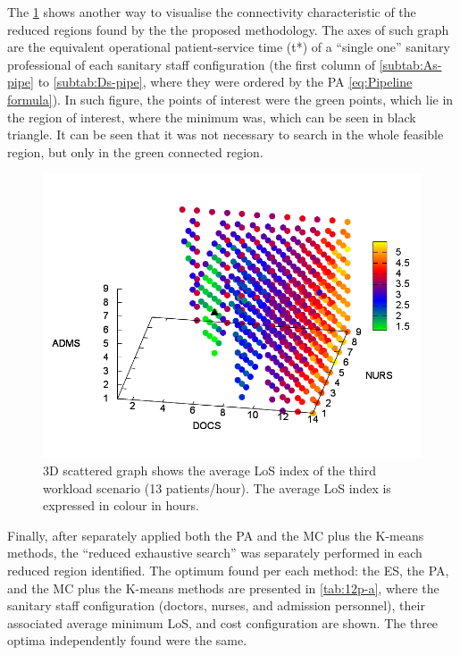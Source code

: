 The \ref{fig:3D-scattered-graph-75} shows another way to visualise
the connectivity characteristic of the reduced regions found by the
the proposed methodology. The axes of such graph are the equivalent
operational patient-service time \foreignlanguage{american}{(t{*})}
of a ``single one'' sanitary professional of each sanitary staff
configuration (the first column of \ref{subtab:As-pipe} to \ref{subtab:Ds-pipe},
where they were ordered by the PA \ref{eq:Pipeline formula}). In
such figure, the points of interest were the green points, which lie
in the region of interest, where the minimum was, which can be seen
in black triangle. It can be seen that it was not necessary to search
in the whole feasible region, but only in the green connected region.
\begin{figure}[h]
\noindent \centering{}\includegraphics[width=0.88\columnwidth,height=0.2\paperheight]{figs4/v0/6400-602-75-3D-scatter-LoS2}\caption{3D scattered graph shows the average LoS index of the third workload
scenario (13 patients/hour). The average LoS index is expressed in
colour in hours. \label{fig:3D-scattered-graph-75}}
\end{figure}


Finally, after separately applied both the PA and the MC plus the
K-means methods, the \textquotedblleft{}reduced exhaustive search\textquotedblright{}
was separately performed in each reduced region identified. The optimum
found per each method: the ES, the PA, and the MC plus the K-means
methods are presented in \ref{tab:12p-a}, where the sanitary staff
configuration (doctors, nurses, and admission personnel), their associated
average minimum LoS, and cost configuration are shown. The three optima
independently found were the same. 

